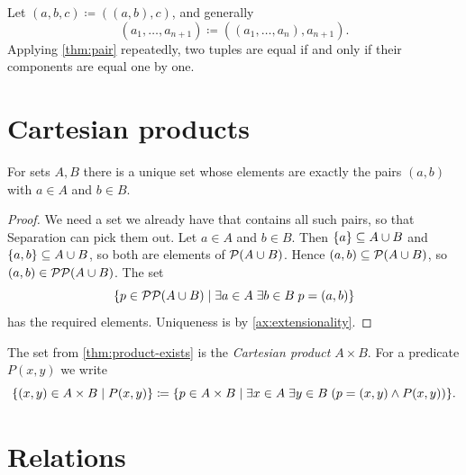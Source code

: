 \begin{definition}[Tuples]
\label{def:tuple}
Let $(a, b, c) \coloneqq ((a, b), c)$, and generally
\[
  (a_1, \dots, a_{n+1}) \coloneqq ((a_1, \dots, a_n), a_{n+1}).
\]
Applying \cref{thm:pair} repeatedly, two tuples are equal if and only if their
components are equal one by one.
\end{definition}

\section{Cartesian products}

\begin{theorem}
\label{thm:product-exists}
For sets $A, B$ there is a unique set whose elements are exactly the pairs $(a,
b)$ with $a \in A$ and $b \in B$.
\end{theorem}

\begin{proof}
We need a set we already have that contains all such pairs, so that Separation
can pick them out. Let $a \in A$ and $b \in B$. Then $\lbrace a \rbrace \subseteq A \cup B$
and $\lbrace a, b \rbrace \subseteq A \cup B$, so both are elements of $\mathcal{P} (A \cup B)$.
Hence $(a, b) \subseteq \mathcal{P} (A \cup B)$, so $(a, b) \in \mathcal{P} \mathcal{P} (A \cup B)$. The
set
\[
  \lbrace p \in \mathcal{P} \mathcal{P} (A \cup B) \mid \exists a \in A\; \exists b \in B\; p = (a,
  b) \rbrace
\]
has the required elements. Uniqueness is by \cref{ax:extensionality}.
\end{proof}

\begin{definition}
\label{def:product}
The set from \cref{thm:product-exists} is the \emph{Cartesian product} $A \times
B$. For a predicate $P(x, y)$ we write
\[
  \lbrace (x, y) \in A \times B \mid P(x, y) \rbrace \coloneqq \lbrace p \in A \times
  B \mid \exists x \in A\; \exists y \in B\; (p = (x, y) \land P(x, y)) \rbrace.
\]
\end{definition}

\section{Relations}

